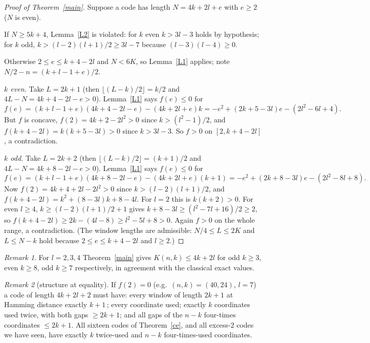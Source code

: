 \documentclass[11pt]{article}
\theoremstyle{remark}
\newtheorem{remark}{Remark}
\begin{document}
\begin{proof}[Proof of Theorem~\ref{main}]
Suppose a code has length $N=4k+2l+e$ with $e\ge 2$ ($N$ is even).

If $N\ge 5k+4$, Lemma~\ref{L2} is violated: for $k$ even $k>3l-3$ holds by hypothesis; for $k$ odd,
$k>(l-2)(l+1)/2\ge 3l-7$ because $(l-3)(l-4)\ge 0$.

Otherwise $2\le e\le k+4-2l$ and $N<6K$, so Lemma~\ref{L1} applies; note $N/2-n=(k+l-1+e)/2$.

\emph{$k$ even.} Take $L=2k+1$ (then $\lfloor(L-k)/2\rfloor=k/2$ and $4L-N=4k+4-2l-e>0$). Lemma~\ref{L1} says $f(e)\le 0$ for
\[ f(e)=(k+l-1+e)(4k+4-2l-e)-(4k+2l+e)k=-e^2+(2k+5-3l)e-(2l^2-6l+4). \]
But $f$ is concave, $f(2)=4k+2-2l^2>0$ since $k>(l^2-1)/2$, and $f(k+4-2l)=k(k+5-3l)>0$ since $k>3l-3$.
So $f>0$ on $[2,k+4-2l]$, a contradiction.

\emph{$k$ odd.} Take $L=2k+2$ (then $\lfloor(L-k)/2\rfloor=(k+1)/2$ and $4L-N=4k+8-2l-e>0$). Lemma~\ref{L1} says $f(e)\le 0$ for
\[ f(e)=(k+l-1+e)(4k+8-2l-e)-(4k+2l+e)(k+1)=-e^2+(2k+8-3l)e-(2l^2-8l+8). \]
Now $f(2)=4k+4+2l-2l^2>0$ since $k>(l-2)(l+1)/2$, and $f(k+4-2l)=k^2+(8-3l)k+8-4l$. For $l=2$ this is $k(k+2)>0$.
For even $l\ge 4$, $k\ge(l-2)(l+1)/2+1$ gives $k+8-3l\ge(l^2-7l+16)/2\ge 2$, so
$f(k+4-2l)\ge 2k-(4l-8)\ge l^2-5l+8>0$. Again $f>0$ on the whole range, a contradiction.
(The window lengths are admissible: $N/4\le L\le 2K$ and $L\le N-k$ hold because $2\le e\le k+4-2l$ and $l\ge 2$.)
\end{proof}

\begin{remark}
For $l=2,3,4$ Theorem~\ref{main} gives $K(n,k)\le 4k+2l$ for odd $k\geq 3$, even $k\ge 8$, odd $k\ge 7$ respectively, in agreement
with the classical exact values.
\end{remark}
\begin{remark}[structure at equality]
If $f(2)=0$ (e.g.\ $(n,k)=(40,24)$, $l=7$) a code of length $4k+2l+2$ must have: every window of length $2k+1$ at
Hamming distance exactly $k+1$\,; every coordinate used; exactly $k$ coordinates used twice, with both gaps $\ge 2k+1$; and all
gaps of the $n-k$ four-times coordinates $\le 2k+1$. All sixteen codes of Theorem~\ref{ce}, and all excess-$2$ codes we have seen, have
exactly $k$ twice-used and $n-k$ four-times-used coordinates.
\end{remark}
\end{document}

